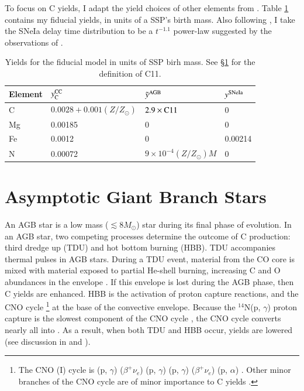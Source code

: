 \documentclass[12pt,oneside]{report}
\newcommand{\Ycc}{\ensuremath{y_{\rm C}^{\rm CC}}}
\newcommand{\sun}{\ensuremath{\odot}}
\newcommand{\alp}{$\alpha$}
\begin{document}
To focus on C yields, I adapt the yield choices of other elements from \citet{james+21, james+23}.
Table \ref{tab:fiducial_mod} contains my fiducial yields, in units of a SSP's birth mass.
Also following \citet{james+21, james+23}, I take the SNeIa delay time distribution to be a
$t^{-1.1}$ power-law suggested by the observations of \citet{maoz+12}.


\begin{table}
	\centering
    \caption[Fiducial Model]{Yields for the fiducial model in units of SSP birh mass. See \S\ref{sec:agb} for the definition of C11.}
	\label{tab:fiducial_mod}

	\begin{tabular}{l l l l}
		\toprule
        Element & $\Ycc$ & $\tilde{y}^{\rm AGB}$ & $y^{\rm SNe Ia}$ \\
		\midrule
        C & $0.0028 + 0.001(Z/Z_\odot)$ & $2.9\times{\rm C11}$ &  0 \\
        Mg & 0.00185 & 0 & 0 \\
        Fe & 0.0012 & 0 & 0.00214 \\
        N & 0.00072 & $9\times10^{-4}(Z/Z_\odot)M$ & 0\\
		\bottomrule
	\end{tabular}
\end{table}

\section{Asymptotic Giant Branch Stars}\label{sec:agb}


An AGB star is a low mass ($\lesssim 8 M_{\sun}$) star during its final phase of evolution.  In an AGB star, two competing processes determine the outcome of C production: third dredge up (TDU) and hot bottom burning (HBB).  TDU accompanies thermal pulses in AGB stars. During a TDU event, material from the CO core is mixed with material exposed to partial He-shell burning, increasing C and O abundances in the envelope \citep{KL14}. If this envelope is lost during the AGB phase, then C yields are enhanced.
HBB is the activation of proton capture reactions, and the CNO cycle%
\footnote{The CNO (I) cycle is
(p, $\gamma$)
($\beta^+ \nu_e$)
(p, $\gamma$)
(p, $\gamma$)
($\beta^{+}\nu_e$)
(p, \alp)
.
 Other minor branches of the CNO cycle are of minor importance to C yields
 \citep{solar-fusion}.
}
at the base of the convective envelope. Because the $^{14}$N(p, $\gamma$) proton capture is the slowest component of the CNO cycle \citep{solar-fusion}, the CNO cycle converts nearly all  into .
As a result, when both TDU and HBB occur,  yields are lowered (see discussion in \citealt{james+23} and \citealt{ventura+13}).
\end{document}
